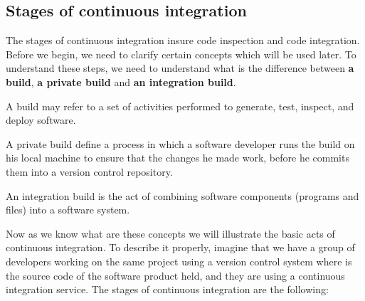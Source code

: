 \subsection{Stages of continuous integration}

The stages of continuous integration insure code inspection and code integration. Before we begin, we need to clarify certain concepts which will be used later. To understand these steps, we need to understand what is the difference between \textbf{a build}, \textbf{a private build} and \textbf{an integration build}.

\begin{DEF}
A build may refer to a set of activities performed to generate, test, inspect, and deploy software\cite{CI}.
\end{DEF}

\begin{DEF}
A private build define a process in which a software developer runs the build on his local machine to ensure that the changes he made work, before he commits them into a version control repository.
\end{DEF}

\begin{DEF}
An integration build is the act of combining software components (programs and files) into a software system\cite{CI}.
\end{DEF}

Now as we know what are these concepts we will illustrate the basic acts of continuous integration. To describe it properly, imagine that we have a group of developers working on the same project using a version control system where is the source code of the software product held, and they are using a continuous integration service. The stages of continuous integration are the following:

